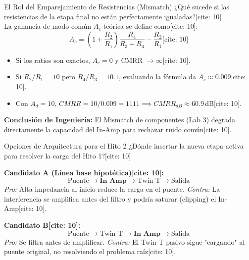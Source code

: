 \documentclass[aspectratio=169]{beamer}
\begin{document}
\begin{frame}{El Rol del Emparejamiento de Resistencias (Mismatch)}
    ¿Qué sucede si las resistencias de la etapa final no están perfectamente igualadas?[cite: 10] \\
    La ganancia de modo común $A_c$ teórica se define como[cite: 10]:
    \begin{equation*}
        A_c = \left(1+\frac{R_2}{R_1}\right)\frac{R_4}{R_3+R_4} - \frac{R_2}{R_1} \text{[cite: 10]}
    \end{equation*}
    \begin{itemize}
        \item Si los ratios son exactos, $A_c = 0$ y CMRR $\to \infty$[cite: 10].
        \item Si $R_2/R_1 = 10$ pero $R_4/R_3 = 10.1$, evaluando la fórmula da $A_c \approx 0.009$[cite: 10].
        \item Con $A_d = 10$, $CMRR = 10/0.009 = 1111 \implies CMRR_{dB} \approx 60.9\,\text{dB}$[cite: 10].
    \end{itemize}
    \textbf{Conclusión de Ingeniería:} El Mismatch de componentes (Lab 3) degrada directamente la capacidad del In-Amp para rechazar ruido común[cite: 10].
\end{frame}

\begin{frame}{Opciones de Arquitectura para el Hito 2}
    ¿Dónde insertar la nueva etapa activa para resolver la carga del Hito 1?[cite: 10]
    
    \vspace{0.3cm}
    \textbf{Candidato A (Línea base hipotética)[cite: 10]:}
    \begin{equation*}
        \boxed{\text{Puente}} \rightarrow \boxed{\textbf{In-Amp}} \rightarrow \boxed{\text{Twin-T}} \rightarrow \text{Salida}
    \end{equation*}
    \textit{Pro:} Alta impedancia al inicio reduce la carga en el puente. \textit{Contra:} La interferencia se amplifica antes del filtro y podría saturar (clipping) el In-Amp[cite: 10].
    
    \vspace{0.3cm}
    \textbf{Candidato B[cite: 10]:}
    \begin{equation*}
        \boxed{\text{Puente}} \rightarrow \boxed{\text{Twin-T}} \rightarrow \boxed{\textbf{In-Amp}} \rightarrow \text{Salida}
    \end{equation*}
    \textit{Pro:} Se filtra antes de amplificar. \textit{Contra:} El Twin-T pasivo sigue "cargando" al puente original, no resolviendo el problema raíz[cite: 10].
\end{frame}
\end{document}

